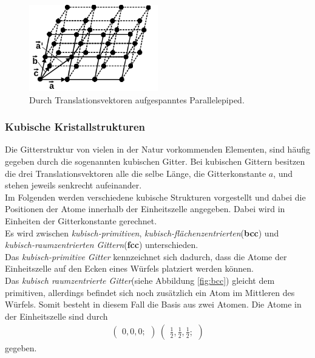 \begin{figure}[hhh]
\centering
\includegraphics[width=0.5\textwidth]{abbildungen/epiped.png}
\caption{Durch Translationsvektoren aufgespanntes Parallelepiped.\cite{sample}}
\label{fig:abb2}
\end{figure}

\subsubsection{Kubische Kristallstrukturen}
\label{subsubsec:kubische_gitter}

Die Gitterstruktur von vielen in der Natur vorkommenden Elementen,
sind häufig gegeben durch die sogenannten kubischen Gitter.
Bei kubischen Gittern besitzen die drei Translationsvektoren
alle die selbe Länge, die Gitterkonstante $a$, und stehen jeweils senkrecht aufeinander.\\
Im Folgenden werden verschiedene kubische Strukturen vorgestellt und dabei die Positionen der Atome innerhalb der
Einheitszelle angegeben. Dabei wird in Einheiten der Gitterkonstante gerechnet.\\
Es wird zwischen \textit{kubisch-primitiven},
\textit{kubisch-flächenzentrierten}(\textbf{bcc}) und \\
\textit{kubisch-raumzentrierten Gittern}(\textbf{fcc}) unterschieden.\\
Das \textit{kubisch-primitive Gitter}
kennzeichnet sich dadurch,
dass die Atome der Einheitszelle auf den Ecken
eines Würfels platziert werden können.\\
Das \textit{kubisch raumzentrierte Gitter}(siehe Abbildung \ref{fig:bcc})
gleicht dem primitiven, allerdings befindet sich noch
zusätzlich ein Atom im Mittleren des Würfels.
Somit besteht in diesem Fall die Basis aus zwei Atomen.
Die Atome in der Einheitszelle sind durch
\begin{align}
\label{eqn:2*}
\begin{pmatrix}
0, 0, 0;
\end{pmatrix} \
\begin{pmatrix}
\frac{1}{2}, \frac{1}{2}, \frac{1}{2};
\end{pmatrix}
\end{align}
gegeben.\\

